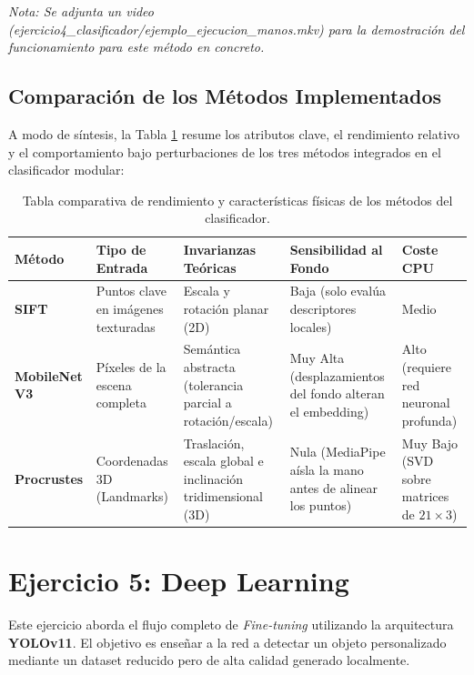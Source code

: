 \documentclass[12pt,a4paper]{article}
\begin{document}
\textit{Nota: Se adjunta un video (ejercicio4\_clasificador/ejemplo\_ejecucion\_manos.mkv) para la demostración del funcionamiento para este método en concreto.}

\subsection{Comparación de los Métodos Implementados}
A modo de síntesis, la Tabla \ref{tab:comparativa_clasificador} resume los atributos clave, el rendimiento relativo y el comportamiento bajo perturbaciones de los tres métodos integrados en el clasificador modular:

\begin{table}[H]
    \centering
    \begin{tabular}{|l|p{2.5cm}|p{3.2cm}|p{2.5cm}|p{2cm}|}
    \hline
    \textbf{Método} & \textbf{Tipo de Entrada} & \textbf{Invarianzas Teóricas} & \textbf{Sensibilidad al Fondo} & \textbf{Coste CPU} \\ \hline
    \textbf{SIFT} & Puntos clave en imágenes texturadas & Escala y rotación planar (2D) & Baja (solo evalúa descriptores locales) & Medio \\ \hline
    \textbf{MobileNet V3} & Píxeles de la escena completa & Semántica abstracta (tolerancia parcial a rotación/escala) & Muy Alta (desplazamientos del fondo alteran el embedding) & Alto (requiere red neuronal profunda) \\ \hline
    \textbf{Procrustes} & Coordenadas 3D (Landmarks) & Traslación, escala global e inclinación tridimensional (3D) & Nula (MediaPipe aísla la mano antes de alinear los puntos) & Muy Bajo (SVD sobre matrices de $21 \times 3$) \\ \hline
    \end{tabular}
    \caption{Tabla comparativa de rendimiento y características físicas de los métodos del clasificador.}
    \label{tab:comparativa_clasificador}
\end{table}

\newpage
\section{Ejercicio 5: Deep Learning}
Este ejercicio aborda el flujo completo de \textit{Fine-tuning} utilizando la arquitectura \textbf{YOLOv11}. El objetivo es enseñar a la red a detectar un objeto personalizado mediante un dataset reducido pero de alta calidad generado localmente.
\end{document}
